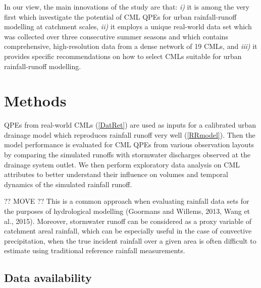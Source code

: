 \documentclass{ctuthesis}\usepackage[]{graphicx}\usepackage[]{color}
\begin{document}
In our view, the main innovations of the study are that: \emph{i)} it is among the very first which investigate the potential of CML QPEs for urban rainfall-runoff modelling at catchment scales, \emph{ii)} it employs a unique real-world data set which was collected over three consecutive summer seasons and which contains comprehensive, high-resolution data from a dense network of 19 CMLs, and \emph{iii)} it provides specific recommendations on how to select CMLs suitable for urban rainfall-runoff modelling.

 
\section{Methods} \label{paperIMnM}

QPEs from real-world CMLs (\ref{DatRet}) are used as inputs for a calibrated urban drainage model which reproduces rainfall runoff very well (\ref{RRmodel}). Then the model performance is evaluated for CML QPEs from various observation layouts by comparing the simulated runoffs with stormwater discharges observed at the drainage system outlet. We then perform exploratory data analysis on CML attributes to better understand their influence on volumes and temporal dynamics of the simulated rainfall runoff. 

?? MOVE ?? This is a common approach when evaluating rainfall data sets for the purposes of hydrological modelling (Goormans and Willems, 2013, Wang et al., 2015). Moreover, stormwater runoff can be considered as a proxy variable of catchment areal rainfall, which can be especially useful in the case of convective precipitation, when the true incident rainfall over a given area is often difficult to estimate using traditional reference rainfall measurements.


\subsection{Data availability} 
\end{document}
